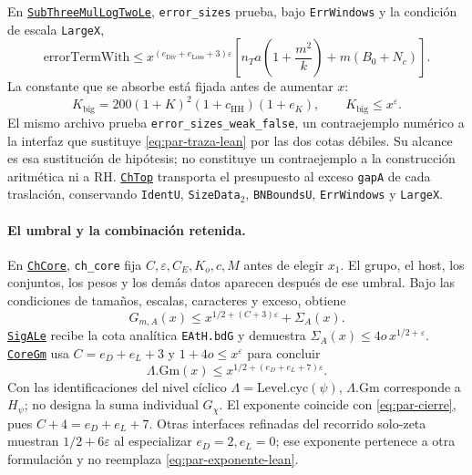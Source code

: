 En \href{https://github.com/CocoSgt/riemann-hypothesis-lean/blob/7cbf7a0c32fca1badf05931879a37c3f8a2b03b4/src/Formalism/SizeWindowBrackets/ChainSlopeWindows/SubThreeMulLogTwoLe.lean}{\texttt{SubThreeMulLogTwoLe}},
\texttt{error\_sizes} prueba, bajo \texttt{ErrWindows}
y la condición de escala \texttt{LargeX},
\[
 \mathrm{errorTermWith}\le
 x^{(e_{\mathrm{Div}}+e_{\mathrm{Loss}}+3)\varepsilon}
 \left[n_Ta\left(1+\frac{m^2}{k}\right)+m(B_0+N_c)\right].
\]
La constante que se absorbe está fijada antes de aumentar $x$:
\[
 K_{\mathrm{big}}=200(1+K)^2(1+c_{\mathrm{HH}})(1+e_K),
 \qquad K_{\mathrm{big}}\le x^\varepsilon.
\]
El mismo archivo prueba \texttt{error\_sizes\_weak\_false},
un contraejemplo numérico a la interfaz que sustituye
\eqref{eq:par-traza-lean} por las dos cotas débiles.
Su alcance es esa sustitución de hipótesis; no constituye un
contraejemplo a la construcción aritmética ni a RH.
\href{https://github.com/CocoSgt/riemann-hypothesis-lean/blob/7cbf7a0c32fca1badf05931879a37c3f8a2b03b4/src/Development/AutomorphicArithmetic/DedekindLFunctions/LandauTheorems/ChTop.lean}{\texttt{ChTop}} transporta el presupuesto al exceso
\texttt{gapA} de cada traslación, conservando
\texttt{IdentU}, \texttt{SizeData}$_2$, \texttt{BNBoundsU},
\texttt{ErrWindows} y \texttt{LargeX}.

\paragraph{El umbral y la combinación retenida.}
En \href{https://github.com/CocoSgt/riemann-hypothesis-lean/blob/7cbf7a0c32fca1badf05931879a37c3f8a2b03b4/src/Development/AutomorphicArithmetic/DedekindLFunctions/LandauTheorems/ChCore.lean}{\texttt{ChCore}},
\texttt{ch\_core} fija $C,\varepsilon,C_E,K_o,c,M$ antes
de elegir $x_1$. El grupo, el host, los conjuntos, los pesos y
los demás datos aparecen después de ese umbral. Bajo las
condiciones de tamaños, escalas, caracteres y exceso, obtiene
\[
 G_{m,A}(x)\le x^{1/2+(C+3)\varepsilon}+\Sigma_A(x).
\]
\href{https://github.com/CocoSgt/riemann-hypothesis-lean/blob/7cbf7a0c32fca1badf05931879a37c3f8a2b03b4/src/Development/AutomorphicArithmetic/PrimitiveCosets/SigALe.lean}{\texttt{SigALe}} recibe la cota analítica
\texttt{EAtH.bdG} y demuestra
$\Sigma_A(x)\le4o\,x^{1/2+\varepsilon}$.
\href{https://github.com/CocoSgt/riemann-hypothesis-lean/blob/7cbf7a0c32fca1badf05931879a37c3f8a2b03b4/src/Development/AutomorphicArithmetic/PrimitiveCosets/CoreGm.lean}{\texttt{CoreGm}} usa $C=e_D+e_L+3$
y $1+4o\le x^\varepsilon$ para concluir
\begin{equation}
 \Lambda.\mathrm{Gm}(x)
       \le x^{1/2+(e_D+e_L+7)\varepsilon}.
 \label{eq:par-exponente-lean}
\end{equation}
Con las identificaciones del nivel cíclico
$\Lambda=\mathrm{Level.cyc}(\psi)$,
$\Lambda.\mathrm{Gm}$ corresponde a $H_\psi$; no designa
la suma individual $G_\chi$. El exponente coincide con
\eqref{eq:par-cierre}, pues $C+4=e_D+e_L+7$.
Otras interfaces refinadas del recorrido solo-zeta muestran
$1/2+6\varepsilon$ al especializar $e_D=2,e_L=0$;
ese exponente pertenece a otra formulación y no reemplaza
\eqref{eq:par-exponente-lean}.

